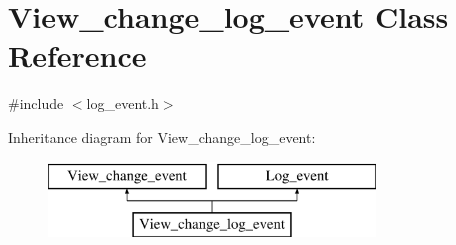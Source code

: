 \hypertarget{classView__change__log__event}{}\section{View\+\_\+change\+\_\+log\+\_\+event Class Reference}
\label{classView__change__log__event}


{\ttfamily \#include $<$log\+\_\+event.\+h$>$}

Inheritance diagram for View\+\_\+change\+\_\+log\+\_\+event\+:\begin{figure}[H]
\begin{center}
\leavevmode
\includegraphics[height=2.000000cm]{classView__change__log__event}
\end{center}
\end{figure}
